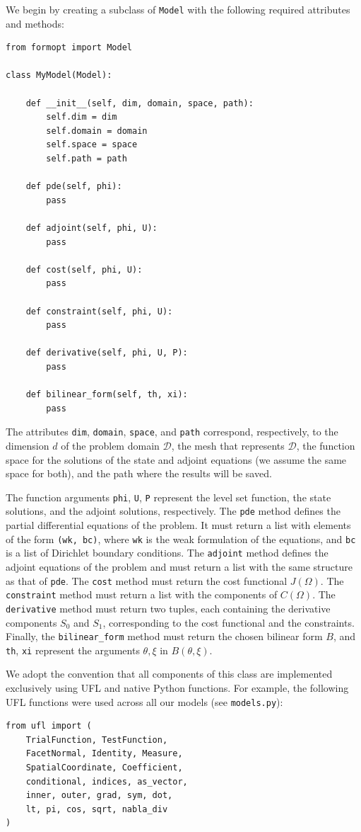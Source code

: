 \documentclass[preprint,9pt]{elsarticle}
\begin{document}
We begin by creating a subclass of \texttt{Model} with the following
required attributes and methods:
\begin{lstlisting}
from formopt import Model

class MyModel(Model):

    def __init__(self, dim, domain, space, path):
        self.dim = dim
        self.domain = domain
        self.space = space
        self.path = path

	def pde(self, phi):
		pass
	
	def adjoint(self, phi, U):
		pass

	def cost(self, phi, U):
		pass
	
    def constraint(self, phi, U):
		pass

	def derivative(self, phi, U, P):
	 	pass
	
	def bilinear_form(self, th, xi):
		pass
\end{lstlisting}
The attributes \texttt{dim}, \texttt{domain}, \texttt{space}, and \texttt{path}
correspond, respectively, to the dimension $d$ of the problem
domain $\mathcal{D}$, the mesh that represents $\mathcal{D}$,
the function space for the solutions of the state and adjoint equations
(we assume the same space for both),
and the path where the results will be saved. 

The function arguments \texttt{phi}, \texttt{U}, \texttt{P} represent
the level set function, the state solutions, and the adjoint solutions,
respectively.
The \texttt{pde} method defines
the partial differential equations of the problem.
It must return a list with elements of the form \texttt{(wk, bc)},
where \texttt{wk} is the weak formulation of the equations,
and \texttt{bc} is a list of Dirichlet boundary conditions.
The \texttt{adjoint} method defines the adjoint equations of the problem and
must return a list with the same structure as that of \texttt{pde}. 
The \texttt{cost} method must return the cost functional $J(\Omega)$.
The \texttt{constraint} method must return
a list with the components of $C(\Omega)$.
The \texttt{derivative} method must return two tuples,
each containing the derivative components $S_0$ and $S_1$,
corresponding to the cost functional and the constraints.
Finally, the \texttt{bilinear\_form} method must return
the chosen bilinear form $B$, and \texttt{th},  \texttt{xi}
represent the arguments $\theta, \xi$ in $B(\theta, \xi)$.

We adopt the convention that all components of this class
are implemented exclusively using UFL and native Python functions.
For example, the following UFL functions were used
across all our models (see \texttt{models.py}):
\begin{lstlisting}
from ufl import (
    TrialFunction, TestFunction,
    FacetNormal, Identity, Measure,
    SpatialCoordinate, Coefficient,
    conditional, indices, as_vector,
    inner, outer, grad, sym, dot,
    lt, pi, cos, sqrt, nabla_div
)
\end{lstlisting}
\end{document}
